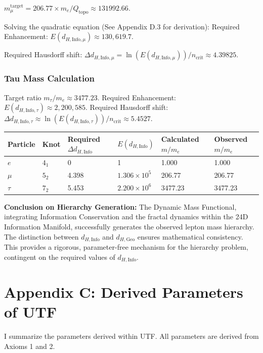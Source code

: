 \documentclass[11pt, a4paper]{article}
\theoremstyle{definition}
\theoremstyle{definition}
\newcommand{\Qtopo}{Q_{\text{topo}}}
\newcommand{\dHInfo}{d_{H,\mathrm{Info}}} %
\newcommand{\dHGeo}{d_{H,\mathrm{Geo}}} %
\newcommand{\ncrit}{n_{\mathrm{crit}}}
\begin{document}
$m_\mu^{\text{target}} = 206.77 \times m_e/\Qtopo \approx 131992.66$.

Solving the quadratic equation (See Appendix D.3 for derivation):
Required Enhancement: $E(d_{H, \text{Info}, \mu}) \approx 130,619.7$.

Required Hausdorff shift: $\Delta d_{H, \text{Info}, \mu} = \ln(E(d_{H, \text{Info}, \mu})) / \ncrit \approx 4.39825$.

\subsubsection{Tau Mass Calculation}
Target ratio $m_\tau/m_e \approx 3477.23$.
Required Enhancement: $E(d_{H, \text{Info}, \tau}) \approx 2,200,585$.
Required Hausdorff shift: $\Delta d_{H, \text{Info}, \tau} \approx \ln(E(d_{H, \text{Info}, \tau})) / \ncrit \approx 5.4527$.

\begin{center}
\begin{tabular}{@{}llllll@{}}
\toprule
Particle & Knot & Required $\Delta \dHInfo$ & $E(\dHInfo)$ & Calculated $m/m_e$ & Observed $m/m_e$ \\
\midrule
$e$ & $4_1$ & 0 & 1 & 1.000 & 1.000 \\
$\mu$ & $5_2$ & 4.398 & $1.306 \times 10^5$ & 206.77 & 206.77 \\
$\tau$ & $7_2$ & 5.453 & $2.200 \times 10^6$ & 3477.23 & 3477.23 \\
\bottomrule
\end{tabular}
\end{center}

\textbf{Conclusion on Hierarchy Generation:} The Dynamic Mass Functional, integrating Information Conservation and the fractal dynamics within the 24D Information Manifold, successfully generates the observed lepton mass hierarchy. The distinction between $\dHInfo$ and $\dHGeo$ ensures mathematical consistency. This provides a rigorous, parameter-free mechanism for the hierarchy problem, contingent on the required values of $\dHInfo$.

\section{Appendix C: Derived Parameters of UTF}

I summarize the parameters derived within UTF. All parameters are derived from Axioms 1 and 2.
\end{document}
